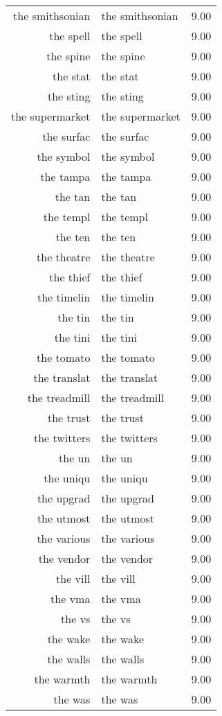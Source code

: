 \begin{table}[ht]
\begin{tabular}{rlr}
  the smithsonian & the smithsonian & 9.00 \\ 
  the spell & the spell & 9.00 \\ 
  the spine & the spine & 9.00 \\ 
  the stat & the stat & 9.00 \\ 
  the sting & the sting & 9.00 \\ 
  the supermarket & the supermarket & 9.00 \\ 
  the surfac & the surfac & 9.00 \\ 
  the symbol & the symbol & 9.00 \\ 
  the tampa & the tampa & 9.00 \\ 
  the tan & the tan & 9.00 \\ 
  the templ & the templ & 9.00 \\ 
  the ten & the ten & 9.00 \\ 
  the theatre & the theatre & 9.00 \\ 
  the thief & the thief & 9.00 \\ 
  the timelin & the timelin & 9.00 \\ 
  the tin & the tin & 9.00 \\ 
  the tini & the tini & 9.00 \\ 
  the tomato & the tomato & 9.00 \\ 
  the translat & the translat & 9.00 \\ 
  the treadmill & the treadmill & 9.00 \\ 
  the trust & the trust & 9.00 \\ 
  the twitters & the twitters & 9.00 \\ 
  the un & the un & 9.00 \\ 
  the uniqu & the uniqu & 9.00 \\ 
  the upgrad & the upgrad & 9.00 \\ 
  the utmost & the utmost & 9.00 \\ 
  the various & the various & 9.00 \\ 
  the vendor & the vendor & 9.00 \\ 
  the vill & the vill & 9.00 \\ 
  the vma & the vma & 9.00 \\ 
  the vs & the vs & 9.00 \\ 
  the wake & the wake & 9.00 \\ 
  the walls & the walls & 9.00 \\ 
  the warmth & the warmth & 9.00 \\ 
  the was & the was & 9.00 \\ 

\end{tabular}
\end{table}
